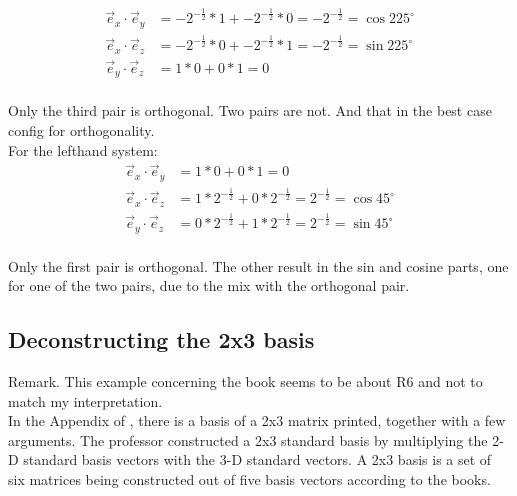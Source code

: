 \documentclass[a4paper]{article}
\begin{document}
\begin{PropositionOpt4}
\begin{displaymath}
\begin{align}
\vec{e}_{x}\cdot\vec{e}_{y} &= -2^{-\frac12}*1 + -2^{-\frac12}*0 = -2^{-\frac12} = \cos225^{\circ}\\
\vec{e}_{x}\cdot\vec{e}_{z} &= -2^{-\frac12}*0 + -2^{-\frac12}*1 = -2^{-\frac12} = \sin225^{\circ}\\
\vec{e}_{y}\cdot\vec{e}_{z} &= 1*0+0*1 = 0\\
\end{align}
\end{displaymath}

Only the third pair is orthogonal. Two pairs are not. And that in the best case config for orthogonality.\\

For the lefthand system:\\

\begin{displaymath}
\begin{align}
\vec{e}_{x}\cdot\vec{e}_{y} &= 1*0+0*1 = 0\\
\vec{e}_{x}\cdot\vec{e}_{z} &= 1*2^{-\frac12} + 0*2^{-\frac12} = 2^{-\frac12} = \cos45^{\circ}\\
\vec{e}_{y}\cdot\vec{e}_{z} &= 0*2^{-\frac12} + 1*2^{-\frac12} = 2^{-\frac12} = \sin45^{\circ}\\
\end{align}
\end{displaymath}

Only the first pair is orthogonal. The other result in the sin and cosine parts, one for one of the two pairs, due to the mix with the orthogonal pair.\\

\subsection{Deconstructing the 2x3 basis} 


Remark. This example concerning the book \cite{Strang1} seems to be about R6 and not to match my interpretation.\\

In the Appendix of \cite{Strang1}, there is a basis of a 2x3 matrix printed, together with a few arguments. The professor constructed a 2x3 standard basis by multiplying the 2-D standard basis vectors with the 3-D standard vectors. A 2x3 basis is a set of six matrices being constructed out of five basis vectors according to the books. \\


\end{PropositionOpt4}
\end{document}
